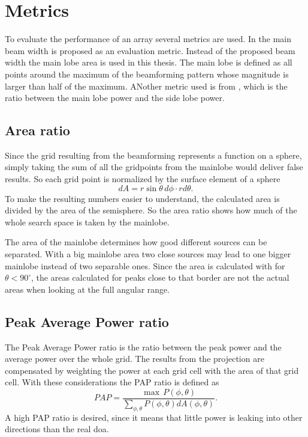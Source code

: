 \section{Metrics}
\label{sec:metrics}
To evaluate the performance of an array several metrics are used.
In \cite{Amaral} the
main beam width is proposed as an evaluation metric.
Instead of the proposed beam width the main lobe area is 
used in this thesis.
The main lobe is defined as all points around the maximum of the 
beamforming pattern whose magnitude is larger than half of the maximum.
ANother metric used is from \cite{GuiAhmad}, which is the ratio
between the main lobe power and the side lobe power.

\subsection{Area ratio}
Since the grid resulting from the beamforming represents a function on a sphere,
simply taking the sum of all the gridpoints from the mainlobe
would deliver false results.
So each grid point is normalized by the surface element of a sphere
\begin{equation}
	dA = r \sin\theta \, d\phi \cdot r d\theta.
\end{equation}
To make the resulting numbers easier to understand, the calculated area is divided
by the area of the semisphere.
So the area ratio shows how much of the whole search space is taken by the mainlobe.

The area of the mainlobe determines how good different sources can be separated.
With a big mainlobe area two close sources may lead to one bigger mainlobe instead
of two separable ones.
Since the area is calculated with for $\theta < 90^\circ$, the areas calculated
for peaks close to that border are not the actual areas when looking at the 
full angular range.


\subsection{Peak Average Power ratio}
The Peak Average Power ratio is the ratio between the peak power and
the average power over the whole grid.
The results from the projection are compensated by weighting
the power at each grid cell with the area of that grid cell.
With these considerations the PAP ratio is defined as
\begin{equation}
	PAP = \frac{\max \, P(\phi, \theta)}{\sum_{\phi, \theta}^{} P(\phi, \theta) dA(\phi, \theta)}.
\end{equation}
A high PAP ratio is desired, since it means that little power is leaking 
into other directions than the real \acrshort{doa}.
